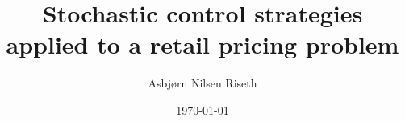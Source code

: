 \documentclass[a4paper,12pt]{article}
\title{Stochastic control strategies applied to a retail
  pricing problem}
\author{Asbj{\o}rn Nilsen Riseth}
\date{\today}
\def\biblio{}
\begin{document}
\maketitle
\listoftodos

\def\biblio{}
\def\listoftodos{}






% 


\appendix


\clearpage


\end{document}
